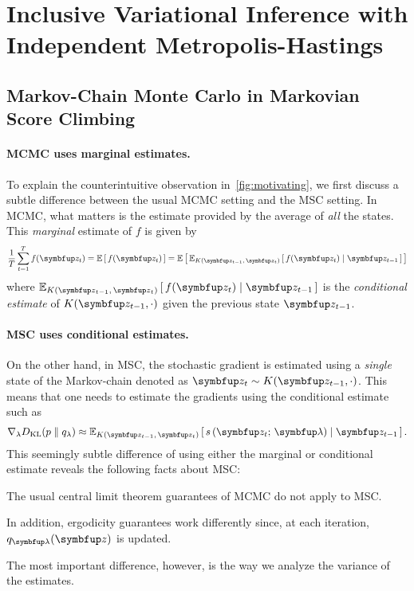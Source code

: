 
\section{Inclusive Variational Inference with Independent Metropolis-Hastings}
\subsection{Markov-Chain Monte Carlo in Markovian Score Climbing}\label{section:msc_mcmc}
\paragraph{MCMC uses marginal estimates.}
To explain the counterintuitive observation in~\cref{fig:motivating}, we first discuss a subtle difference between the usual MCMC setting and the MSC setting.
In MCMC, what matters is the estimate provided by the average of \textit{all} the states.
This \textit{marginal} estimate of \(f\) is given by
\begin{align}
  \frac{1}{T} \sum^{T}_{t=1} f(\vz_t) = \E{f(\vz_t)} = \E{\Esub{K(\vz_{t-1},\,\vz_t)}{ f(\vz_t) \mid \vz_{t-1}}}
\end{align}
where \(\Esub{K(\vz_{t-1},\,\vz_{t})}{ f(\vz_t) \mid \vz_{t-1}}\) is the \textit{conditional estimate} of \(K(\vz_{t-1},\cdot)\) given the previous state \(\vz_{t-1}\).

\paragraph{MSC uses conditional estimates.}
On the other hand, in MSC, the stochastic gradient is estimated using a \textit{single} state of the Markov-chain denoted as \(\vz_t \sim K(\vz_{t-1}, \cdot)\).
This means that one needs to estimate the gradients using the conditional estimate such as
\begin{align}
  \nabla_{\lambda} \DKL{p}{q_{\lambda}} \approx \Esub{K(\vz_{t-1},\,\vz_t)}{s\,(\vz_t;\, \vlambda) \mid \vz_{t-1}}.
\end{align}
This seemingly subtle difference of using either the marginal or conditional estimate reveals the following facts about MSC:
\begin{enumerate*}[label=(\roman*)]
\item The usual central limit theorem guarantees of MCMC do not apply to MSC.
\item In addition, ergodicity guarantees work differently since, at each iteration, \(q_{\vlambda}(\vz)\) is updated.
\end{enumerate*}
The most important difference, however, is the way we analyze the variance of the estimates.

